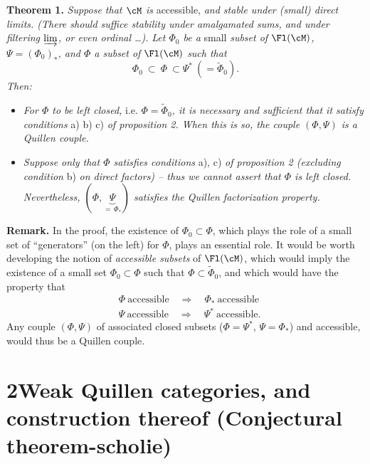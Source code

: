 \setcounter{footnote}{4}

\textbf{Theorem 1.} \textit{Suppose that $\cM$ is} accessible, \textit{and stable under (small) direct limits. (There should suffice stability under amalgamated sums, and under filtering $\varinjlim$, or even ordinal \dots).} \textit{Let $\Phi_0$ be a} small \textit{subset of} $\Fl(\cM)$\textit{, $\Psi=(\Phi_0)_*$, and $\Phi$ a subset of} $\Fl(\cM)$ \textit{such that}
\[
\Phi_0\ \subset\ \Phi\ \subset\Psi^*\ (=\widetilde{\Phi}_0).
\]
\textit{Then:}

\begin{itemize}[leftmargin=2.5em]
\item[a)] \textit{For $\Phi$ to be left closed,} i.e. $\Phi=\widetilde{\Phi}_0$\textit{, it is necessary and sufficient that it satisfy conditions} a) b) c) \textit{of proposition 2. When this is so, the couple $(\Phi,\Psi)$ is a Quillen couple.}

\item[b)] \textit{Suppose only that $\Phi$ satisfies conditions} a), c) \textit{of proposition 2 (excluding condition} b) \textit{on direct factors) – thus we cannot assert that $\Phi$ is left closed. Nevertheless, $(\Phi,\underbrace{\Psi}_{=\,\Phi_*})$ satisfies the Quillen factorization property.}
\end{itemize}

\textbf{Remark.} In the proof, the existence of $\Phi_0\subset\Phi$, which plays the role of a small set of ``generators'' (on the left) for $\Phi$, plays an essential role. It would be worth developing the notion of \textit{accessible subsets}
of $\Fl(\cM)$, which would imply the existence of a small set $\Phi_0\subset\Phi$ such that $\Phi\subset\widetilde{\Phi}_0$, and which would have the property that
\[
\begin{aligned}
&\Phi\ \text{accessible}\quad\Longrightarrow\quad\Phi_*\ \text{accessible}\\
&\Psi\ \text{accessible}\quad\Longrightarrow\quad\Psi^*\ \text{accessible.}
\end{aligned}
\]
Any couple $(\Phi,\Psi)$ of associated closed subsets ($\Phi=\Psi^*$, $\Psi=\Phi_*$) and accessible, would thus be a Quillen couple.

\section*{2\quad Weak Quillen categories, and construction thereof (Conjectural theorem-scholie)}

